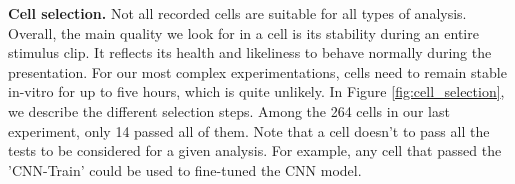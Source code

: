

\textbf{Cell selection.}
Not all recorded cells are suitable for all types of analysis. Overall, the
main quality we look for in a cell is its stability during an entire stimulus
clip.
It reflects its health and likeliness to behave normally during the
presentation. For our most complex experimentations, cells need to remain
stable in-vitro for up to five hours, which is quite unlikely. In Figure
\ref{fig:cell_selection}, we
describe the different selection steps. Among the 264 cells
in our last experiment, only 14 passed all of them. Note that a cell doesn't to
pass all the tests to be considered for a given analysis. For example, any cell
that passed the 'CNN-Train' could be used to fine-tuned the CNN model.

